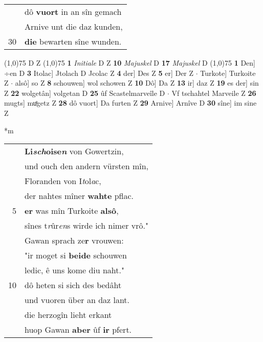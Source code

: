\documentclass[8pt,a4paper,notitlepage]{article}
\begin{document}
\begin{table}[ht]
\begin{minipage}[t]{0.5\linewidth}
\begin{tabular}{rl}
 & dô \textbf{vuort} in an sîn gemach\\ 
 & Arnive unt die daz kunden,\\ 
30 & \textbf{die} bewarten sîne wunden.\\ 
\end{tabular}
\scriptsize
\line(1,0){75} \newline
D Z \newline
\line(1,0){75} \newline
\textbf{1} \textit{Initiale} D Z  \textbf{10} \textit{Majuskel} D  \textbf{17} \textit{Majuskel} D  \newline
\line(1,0){75} \newline
\textbf{1} Den] ÷en D \textbf{3} Itolac] Jtolach D Jcolac Z \textbf{4} der] Des Z \textbf{5} er] Der Z  $\cdot$ Turkote] Turkoite Z  $\cdot$ alsô] so Z \textbf{8} schouwen] wol schowen Z \textbf{10} Dô] Da Z \textbf{13} ir] daz Z \textbf{19} es der] sin Z \textbf{22} wolgetân] volgetan D \textbf{25} ûf Scastelmarveîle D  $\cdot$ Vf tschahtel Marveile Z \textbf{26} mugts] muͤgetz Z \textbf{28} dô vuort] Da furten Z \textbf{29} Arnive] Arnîve D \textbf{30} sîne] im sine Z \newline
\end{minipage}
\hspace{0.5cm}
\begin{minipage}[t]{0.5\linewidth}
\small
\begin{center}*m
\end{center}
\begin{tabular}{rl}
 & \textbf{Li\textit{sch}oise\textit{n}} von Gowertzin,\\ 
 & und ouch den andern vürsten mîn,\\ 
 & Floranden von I\textit{t}ol\textit{a}c,\\ 
 & der nahtes mîner \textbf{wahte} pflac.\\ 
5 & \textbf{er} was mîn Turkoite \textbf{alsô},\\ 
 & sînes t\textit{r}ûr\textit{en}s wirde ich nimer vrô."\\ 
 & Gawan sprach ze\textbf{r} vrouwen:\\ 
 & "ir moget si \textbf{beide} schouwen\\ 
 & ledic, ê uns kome diu naht."\\ 
10 & dô heten si sich des bedâht\\ 
 & und vuoren über an daz lant.\\ 
 & die herzogîn lieht erkant\\ 
 & huop Gawan \textbf{aber} ûf \textbf{ir} pfert.\\ 

\end{tabular}
\end{minipage}
\end{table}
\end{document}
